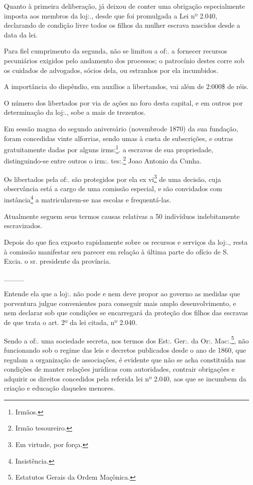Quanto à primeira deliberação, já deixou de conter uma obrigação
especialmente imposta aos membros da loj:., desde que foi promulgada a
Lei nº 2.040, declarando de condição livre todos os filhos da mulher
escrava nascidos desde a data da lei.

Para fiel cumprimento da segunda, não se limitou a of:. a fornecer
recursos pecuniários exigidos pelo andamento dos processos; o patrocínio
destes corre sob os cuidados de advogados, sócios dela, ou estranhos por
ela incumbidos.

A importância do dispêndio, em auxílios a libertandos, vai além de
2:000\$ de réis.

O número dos libertados por via de ações no foro desta capital, e em
outros por determinação da loj:., sobe a mais de trezentos.

Em sessão magna do segundo aniversário (novembrode 1870) da sua
fundação, foram concedidas vinte alforrias, sendo umas à custa de
subscrições, e outras gratuitamente dadas por alguns irms:\footnote{
  Irmãos.}. a escravos de sua propriedade, distinguindo-se entre outros
o irm:. tes:.\footnote{ Irmão tesoureiro.} Joao Antonio da Cunha.

Os libertados pela of:. são protegidos por ela ex vi\footnote{ Em
  virtude, por força.} de uma decisão, cuja observância está a cargo de
uma comissão especial, e são convidados com instância\footnote{
  Insistência.} a matricularem-se nas escolas e frequentá-las.

Atualmente seguem seus termos causas relativas a 50 indivíduos
indebitamente escravizados.

Depois do que fica exposto rapidamente sobre os recursos e serviços da
loj:., resta à comissão manifestar seu parecer em relação à última parte
do ofício de S. Excia. o sr. presidente da província.

\_\_\_\_

Entende ela que a loj:. não pode e nem deve propor ao governo as medidas
que porventura julgue convenientes para conseguir mais amplo
desenvolvimento, e nem declarar sob que condições se encarregará da
proteção dos filhos das escravas de que trata o art. 2º da lei citada,
nº 2.040.

Sendo a of:. uma sociedade secreta, nos termos dos Est:. Ger:. da Or:.
Mac:.\footnote{ Estatutos Gerais da Ordem Maçônica.}, não funcionando
sob o regime das leis e decretos publicados desde o ano de 1860, que
regulam a organização de associações, é evidente que não se acha
constituída nas condições de manter relações jurídicas com autoridades,
contrair obrigações e adquirir os direitos concedidos pela referida lei
nº 2.040, aos que se incumbem da criação e educação daqueles menores.

